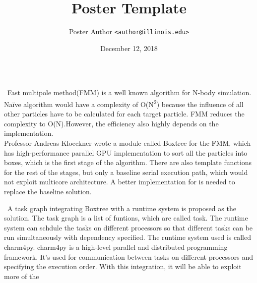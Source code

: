 \documentclass[final,t]{beamer}
\title{Poster Template}
\author{Poster Author \texttt{<author@illinois.edu>}}
\institute{%
  Computer Science
  $\cdot$ University of Illinois
}
\date{December 12, 2018}
\begin{document}
\begin{frame}[fragile]{}
  \begin{columns}[t]


    \begin{column}{.45\linewidth}
      \begin{tcolorbox}[toplevelbox,adjusted title={Problem Statement}]
        \ Fast multipole method(FMM) is a well known algorithm for N-body simulation. Naïve algorithm would have a complexity of O(N\textsuperscript{2}) because the influence of all other particles have to be calculated for each target particle. FMM reduces the complexity to O(N).However, the efficiency also highly depends on the implementation. 
        \\  Professor Andreas Kloeckner wrote a module called Boxtree for the FMM, which has high-performance parallel GPU implementation to sort all the particles into boxes, which is the first stage of the algorithm. There are also template functions for the rest of the stages, but only a  baseline serial execution path, which would not exploit multicore architecture. A better implementation for is needed to replace the baseline solution.
        
      \end{tcolorbox}

      \begin{tcolorbox}[toplevelbox,adjusted title=Approach]
        \ A task graph integrating Boxtree with a runtime system is proposed as the 
          solution. The task graph is a list of funtions, which are called task. The runtime system can schdule the tasks on different processors so that different tasks can be run simultaneously with dependency specified. The runtime system
          used is called charm4py. charm4py is a high-level parallel and distributed programming framework. It's used for communication between tasks on different
          processors and specifying the execution order. With this integration, it will be able to exploit more of the 
      \end{tcolorbox}


\end{column}
\end{columns}
\end{frame}
\end{document}
